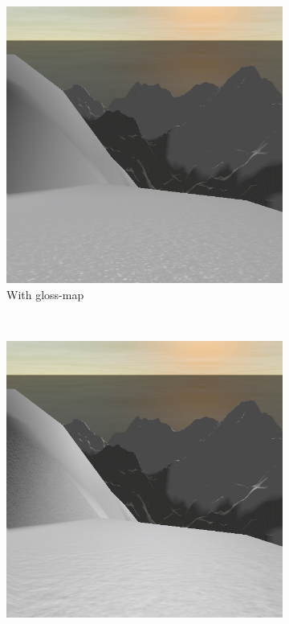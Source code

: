 \documentclass{article}
\begin{document}
\begin{figure}[H]
\begin{subfigure}[b]{0.45\textwidth}
        \includegraphics[scale=0.25]{glossMap}
        \caption{With gloss-map}
        \label{fig:glossMap}
    \end{subfigure}
    ~
    \begin{subfigure}[b]{0.45\textwidth}
        \centering
        \includegraphics[scale=0.25]{normalMap}

\end{subfigure}
\end{figure}
\end{document}

